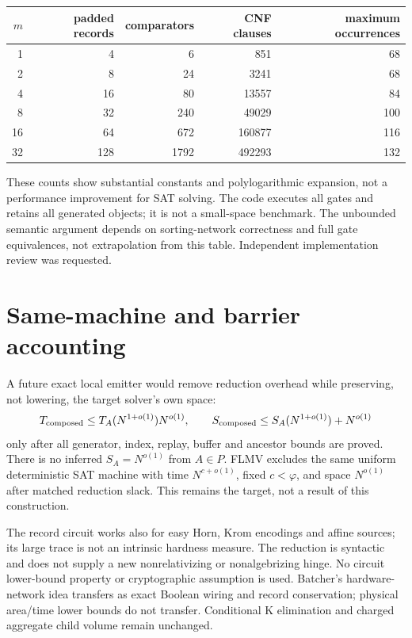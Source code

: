 \documentclass[11pt]{article}
\begin{document}
\begin{center}\begin{tabular}{rrrrr}\toprule
$m$&padded records&comparators&CNF clauses&maximum occurrences\\\midrule
1&4&6&851&68\\
2&8&24&3241&68\\
4&16&80&13557&84\\
8&32&240&49029&100\\
16&64&672&160877&116\\
32&128&1792&492293&132\\\bottomrule
\end{tabular}\end{center}
These counts show substantial constants and polylogarithmic expansion,
not a performance improvement for SAT solving. The code executes all gates
and retains all generated objects; it is not a small-space benchmark.
The unbounded semantic argument depends on sorting-network correctness and
full gate equivalences, not extrapolation from this table.
Independent implementation review was requested.

\section{Same-machine and barrier accounting}
A future exact local emitter would remove reduction overhead while preserving,
not lowering, the target solver's own space:
\[
 T_{\rm composed}\le T_A(N^{1+o(1)})N^{o(1)},\qquad
 S_{\rm composed}\le S_A(N^{1+o(1)})+N^{o(1)}
\]
only after all generator, index, replay, buffer and ancestor bounds are proved.
There is no inferred $S_A=N^{o(1)}$ from $A\in P$.
FLMV excludes the same uniform deterministic SAT machine with
time $N^{c+o(1)}$, fixed $c<\varphi$, and space $N^{o(1)}$ after matched
reduction slack. This remains the target, not a result of this construction.

The record circuit works also for easy Horn, Krom encodings and affine
sources; its large trace is not an intrinsic hardness measure.
The reduction is syntactic and does not supply a new nonrelativizing or
nonalgebrizing hinge. No circuit lower-bound property or cryptographic
assumption is used. Batcher's hardware-network idea transfers as exact
Boolean wiring and record conservation; physical area/time lower bounds
do not transfer. Conditional K elimination and charged aggregate child
volume remain unchanged.
\end{document}
